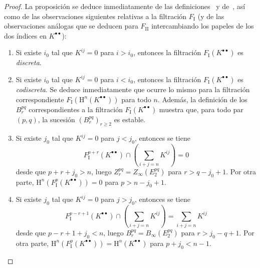 \begin{proof}
La proposición se deduce inmediatamente de las definiciones~ y de~, así como de las observaciones siguientes relativas a la filtración $F_{\mathrm I}$ (y de las observaciones análogas que se deducen para $F_{\mathrm{II}}$ intercambiando los papeles de los dos índices en $K^{\bullet\bullet}$):
\begin{enumerate}
  \item[{$1^\circ$}] Si existe $i_0$ tal que $K^{ij}=0$ para $i>i_0$, entonces la filtración $F_{\mathrm I}(K^{\bullet\bullet})$ es \emph{discreta}.
  \item[{$2^\circ$}] Si existe $i_0$ tal que $K^{ij}=0$ para $i<i_0$, entonces la filtración $F_{\mathrm I}(K^{\bullet\bullet})$ es \emph{codiscreta}.
    Se deduce inmediatamente que ocurre lo mismo para la filtración correspondiente $F_{\mathrm I}(\mathrm H^n(K^{\bullet\bullet}))$ para todo $n$.
    Además, la definición de los $B_r^{pq}$ correspondientes a la filtración $F_{\mathrm I}(K^{\bullet\bullet})$  muestra que, para todo par $(p,q)$, la sucesión $(B_r^{pq})_{r\geq2}$ es estable.
  \item[{$3^\circ$}] Si existe $j_0$ tal que $K^{ij}=0$ para $j<j_0$, entonces se tiene
    \[
      F_{\mathrm I}^{p+r}(K^{\bullet\bullet})
      \cap\left(\sum_{i+j=n}K^{ij}\right)=0
    \]
    desde que $p+r+j_0>n$, luego $Z_r^{pq}=Z_\infty(E_2^{pq})$ para $r>q-j_0+1$.
    Por otra parte, $\mathrm H^n(F_{\mathrm I}^p(K^{\bullet\bullet}))=0$ para $p>n-j_0+1$.
  \item[{$4^\circ$}] Si existe $j_0$ tal que $K^{ij}=0$ para $j>j_0$, entonces se tiene
    \[
      F_{\mathrm I}^{p-r+1}(K^{\bullet\bullet})
      \cap\left(\sum_{i+j=n}K^{ij}\right)=\sum_{i+j=n}K^{ij}
    \]
    desde que $p-r+1+j_0<n$, luego $B_r^{pq}=B_\infty(E_2^{pq})$ para $r>j_0-q+1$.
    Por otra parte, $\mathrm H^n(F_{\mathrm I}^p(K^{\bullet\bullet}))
    =\mathrm H^n(K^{\bullet\bullet})$ para $p+j_0<n-1$.
\end{enumerate}
\end{proof}

